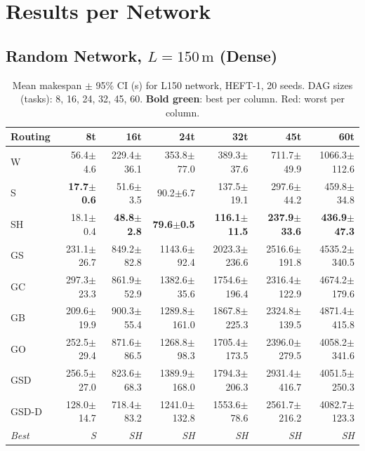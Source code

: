 \documentclass[11pt]{article}
\newcommand{\win}[1]{\textcolor{green!50!black}{\textbf{#1}}}
\newcommand{\bad}[1]{\textcolor{red!70!black}{#1}}
\begin{document}
\section{Results per Network}

\subsection{Random Network, $L=150\,\mathrm{m}$ (Dense)}

\begin{table}[H]
\centering
\small
\setlength{\tabcolsep}{4pt}
\begin{tabular}{l  r r r r r r}
\toprule
\textbf{Routing} & \textbf{8t} & \textbf{16t} & \textbf{24t} & \textbf{32t} & \textbf{45t} & \textbf{60t} \\
\midrule
  W & 56.4$\pm$4.6 & 229.4$\pm$36.1 & 353.8$\pm$77.0 & 389.3$\pm$37.6 & 711.7$\pm$49.9 & 1066.3$\pm$112.6 \\
  S & \win{17.7$\pm$0.6} & 51.6$\pm$3.5 & 90.2$\pm$6.7 & 137.5$\pm$19.1 & 297.6$\pm$44.2 & 459.8$\pm$34.8 \\
  SH & 18.1$\pm$0.4 & \win{48.8$\pm$2.8} & \win{79.6$\pm$0.5} & \win{116.1$\pm$11.5} & \win{237.9$\pm$33.6} & \win{436.9$\pm$47.3} \\
  GS & 231.1$\pm$26.7 & 849.2$\pm$82.8 & 1143.6$\pm$92.4 & \bad{2023.3$\pm$236.6} & 2516.6$\pm$191.8 & 4535.2$\pm$340.5 \\
  GC & \bad{297.3$\pm$23.3} & 861.9$\pm$52.9 & 1382.6$\pm$35.6 & 1754.6$\pm$196.4 & 2316.4$\pm$122.9 & 4674.2$\pm$179.6 \\
  GB & 209.6$\pm$19.9 & \bad{900.3$\pm$55.4} & 1289.8$\pm$161.0 & 1867.8$\pm$225.3 & 2324.8$\pm$139.5 & \bad{4871.4$\pm$415.8} \\
  GO & 252.5$\pm$29.4 & 871.6$\pm$86.5 & 1268.8$\pm$98.3 & 1705.4$\pm$173.5 & 2396.0$\pm$279.5 & 4058.2$\pm$341.6 \\
  GSD & 256.5$\pm$27.0 & 823.6$\pm$68.3 & \bad{1389.9$\pm$168.0} & 1794.3$\pm$206.3 & \bad{2931.4$\pm$416.7} & 4051.5$\pm$250.3 \\
  GSD\mbox{-}D & 128.0$\pm$14.7 & 718.4$\pm$83.2 & 1241.0$\pm$132.8 & 1553.6$\pm$78.6 & 2561.7$\pm$216.2 & 4082.7$\pm$123.3 \\
\midrule
  \textit{Best} & \textit{S} & \textit{SH} & \textit{SH} & \textit{SH} & \textit{SH} & \textit{SH} \\
\bottomrule
\end{tabular}
\caption{Mean makespan $\pm$ 95\% CI (s) for L150 network, HEFT-1, 20 seeds. DAG sizes (tasks): 8, 16, 24, 32, 45, 60. \win{Bold green}: best per column. \bad{Red}: worst per column.}
\end{table}
\end{document}
